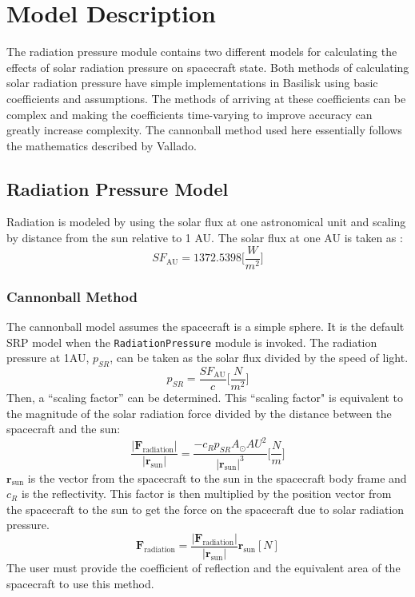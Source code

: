 \section{Model Description}
The radiation pressure module contains two different models for calculating the effects of solar radiation pressure on spacecraft state. Both methods of calculating solar radiation pressure have simple implementations in Basilisk using basic coefficients and assumptions. The methods of arriving at these coefficients can be complex and making the coefficients time-varying to improve accuracy can greatly increase complexity. The cannonball method used here essentially follows the mathematics described by Vallado\cite{vallado2001}.

\subsection{Radiation Pressure Model}
Radiation is modeled by using the solar flux at one astronomical unit and scaling by distance from the sun relative to 1 AU. The solar flux at one AU is taken as :
\begin{equation}
SF_{\mathrm{AU}} = 1372.5398    \bigg[\frac{W}{m^2}\bigg]
\end{equation}
\subsubsection{Cannonball Method}
The cannonball model assumes the spacecraft is a simple sphere.  It is the default SRP model when the {\tt RadiationPressure} module is invoked.  The radiation pressure at 1AU, $p_{SR}$, can be taken as the solar flux divided by the speed of light. 
\begin{equation}
	p_{SR} = \frac{SF_{\mathrm{AU}}}{c} \bigg[\frac{N}{m^2}\bigg]
\end{equation}
Then, a ``scaling factor'' can be determined. This ``scaling factor" is equivalent to the magnitude of the solar radiation force divided by the distance between the spacecraft and the sun:
\begin{equation}
	\frac{|\mathbf{F}_{\textrm{radiation}}|}{|\mathbf{r}_{\textrm{sun}}|} = \frac{-c_{R}p_{SR}A_{\odot}{AU}^2}{|\mathbf{r}_{\textrm{sun}}|^3} \bigg[\frac{N}{m}\bigg]
\end{equation}
$\mathbf{r}_{\textrm{sun}}$ is the vector from the spacecraft to the sun in the spacecraft body frame and $c_R$ is the reflectivity. This factor is then multiplied by the position vector from the spacecraft to the sun to get the force on the spacecraft due to solar radiation pressure.
\begin{equation}
	{\mathbf{F}_{\textrm{radiation}}} = \frac{|\mathbf{F}_{\textrm{radiation}}|}{|\mathbf{r}_{\textrm{sun}}|}  \mathbf{r}_{\textrm{sun}} [N]
\end{equation}
The user must provide the coefficient of reflection and the equivalent area of the spacecraft to use this method.\\

